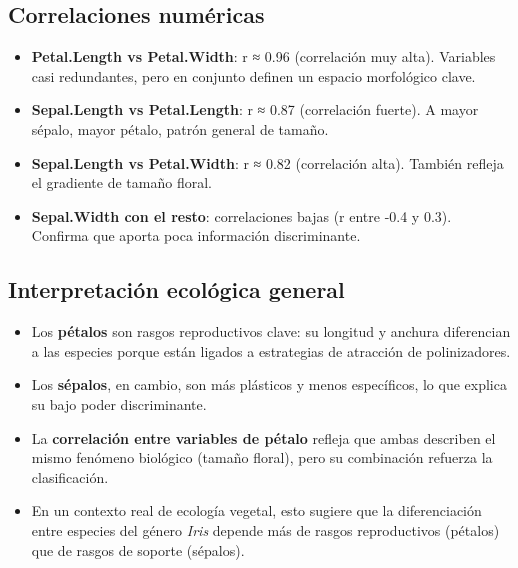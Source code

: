 \documentclass[
  spanish,
  11pt,
  a4paper,
  DIV=11,
  numbers=noendperiod]{scrartcl}
\providecommand{\tightlist}{%
  \setlength{\itemsep}{0pt}\setlength{\parskip}{0pt}}
\begin{document}
\subsection{Correlaciones numéricas}\label{correlaciones-numuxe9ricas}

\begin{itemize}
\tightlist
\item
  \textbf{Petal.Length vs Petal.Width}: r ≈ 0.96 (correlación muy alta).
  Variables casi redundantes, pero en conjunto definen un espacio
  morfológico clave.\\
\item
  \textbf{Sepal.Length vs Petal.Length}: r ≈ 0.87 (correlación fuerte).
  A mayor sépalo, mayor pétalo, patrón general de tamaño.\\
\item
  \textbf{Sepal.Length vs Petal.Width}: r ≈ 0.82 (correlación alta).
  También refleja el gradiente de tamaño floral.\\
\item
  \textbf{Sepal.Width con el resto}: correlaciones bajas (r entre -0.4 y
  0.3). Confirma que aporta poca información discriminante.
\end{itemize}

\subsection{Interpretación ecológica
general}\label{interpretaciuxf3n-ecoluxf3gica-general}

\begin{itemize}
\tightlist
\item
  Los \textbf{pétalos} son rasgos reproductivos clave: su longitud y
  anchura diferencian a las especies porque están ligados a estrategias
  de atracción de polinizadores.\\
\item
  Los \textbf{sépalos}, en cambio, son más plásticos y menos
  específicos, lo que explica su bajo poder discriminante.\\
\item
  La \textbf{correlación entre variables de pétalo} refleja que ambas
  describen el mismo fenómeno biológico (tamaño floral), pero su
  combinación refuerza la clasificación.\\
\item
  En un contexto real de ecología vegetal, esto sugiere que la
  diferenciación entre especies del género \emph{Iris} depende más de
  rasgos reproductivos (pétalos) que de rasgos de soporte (sépalos).
\end{itemize}
\end{document}
